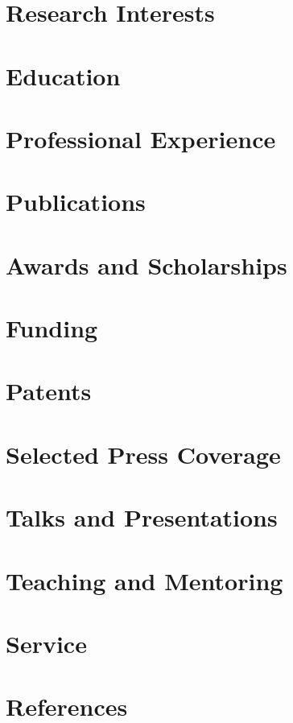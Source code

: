 \documentclass{chencv}
\affiliation{University of California, Los Angeles}
\begin{document}
\makecvtitle

\section{Research Interests}


\section{Education}


\section{Professional Experience}


\section{Publications}


\section{Awards and Scholarships}


\section{Funding}


\section{Patents}


\section{Selected Press Coverage}


\section{Talks and Presentations}


\section{Teaching and Mentoring}


\section{Service}


\section{References}

\end{document}
